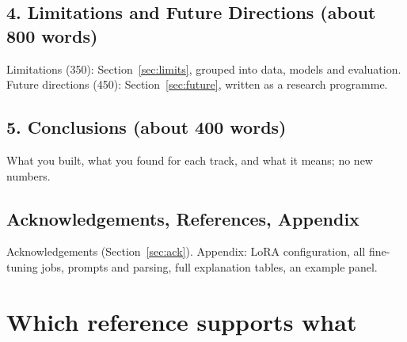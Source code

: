 \subsection*{4. Limitations and Future Directions (about 800 words)}
Limitations (350): Section~\ref{sec:limits}, grouped into data, models and evaluation. Future directions (450): Section~\ref{sec:future}, written as a research programme.

\subsection*{5. Conclusions (about 400 words)}
What you built, what you found for each track, and what it means; no new numbers.

\subsection*{Acknowledgements, References, Appendix}
Acknowledgements (Section~\ref{sec:ack}). Appendix: LoRA configuration, all fine-tuning jobs, prompts and parsing, full explanation tables, an example panel.

\section{Which reference supports what}

